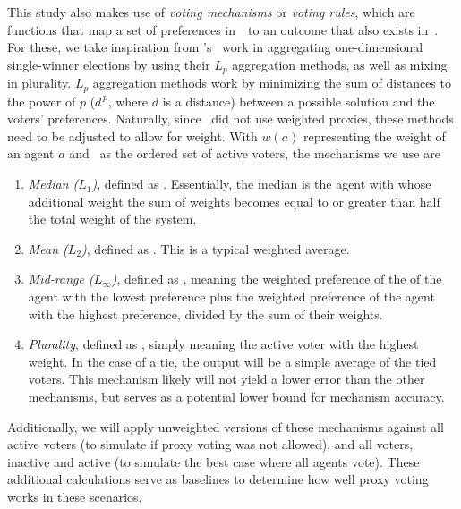 This study also makes use of \textit{voting mechanisms} or \textit{voting rules},
which are functions that map a set of preferences in~\systemspace\ to an outcome that
also exists in~\systemspace.
For these, we take inspiration from 's~\cite{Bulteau2021} work in
aggregating one-dimensional single-winner elections by using their $L_p$ aggregation
methods, as well as mixing in plurality.
$L_p$ aggregation methods work by minimizing the sum of distances to the power of $p$
($d^{\,p}$, where $d$ is a distance) between a possible solution and the voters'
preferences.
Naturally, since~\cite{Bulteau2021} did not use weighted proxies, these methods need
to be adjusted to allow for weight.
With $w(a)$ representing the weight of an agent $a$ and \systemproxies\ as the ordered
set of active voters, the mechanisms we use are
\begin{enumerate}
    \item {
        \textit{Median ($L_1$)}, defined as
        $$.
        Essentially, the median is the agent with whose additional weight the sum of
        weights becomes equal to or greater than half the total weight of the system.
    }
    \item {
        \textit{Mean ($L_2$)}, defined as
        $$.
        This is a typical weighted average.
    }
    \item {
        \textit{Mid-range ($L_\infty$)}, defined as
        $$, meaning the weighted
        preference of the of the agent with the lowest preference plus the weighted
        preference of the agent with the highest preference, divided by the sum of
        their weights.
    }
    \item {
        \textit{Plurality}, defined as
        $$, simply meaning the
        active voter with the highest weight.
        In the case of a tie, the output will be a simple average of the tied voters.
        This mechanism likely will not yield a lower error than the other mechanisms,
        but serves as a potential lower bound for mechanism accuracy.
    }
\end{enumerate}
Additionally, we will apply unweighted versions of these mechanisms against all active
voters (to simulate if proxy voting was not allowed), and all voters, inactive and
active (to simulate the best case where all agents vote).
These additional calculations serve as baselines to determine how well proxy voting
works in these scenarios.

